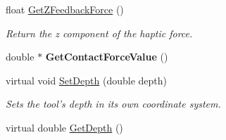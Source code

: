 \begin{DoxyCompactItemize}
float \hyperlink{classvtkToolLaparoscopy_a2743b59822a1b2b2d8c04f45dca44e32}{GetZFeedbackForce} ()
\begin{DoxyCompactList}\small\item\em Return the z component of the haptic force. \item\end{DoxyCompactList}\item 
\hypertarget{classvtkToolLaparoscopy_a18bfe188dcad7c3a92cfdcd8ae884793}{
double $\ast$ {\bfseries GetContactForceValue} ()}
\label{classvtkToolLaparoscopy_a18bfe188dcad7c3a92cfdcd8ae884793}

\item 
\hypertarget{classvtkToolLaparoscopy_aea85d0db2cb378945849caacee3bc9c3}{
virtual void \hyperlink{classvtkToolLaparoscopy_aea85d0db2cb378945849caacee3bc9c3}{SetDepth} (double depth)}
\label{classvtkToolLaparoscopy_aea85d0db2cb378945849caacee3bc9c3}

\begin{DoxyCompactList}\small\item\em Sets the tool's depth in its own coordinate system. \item\end{DoxyCompactList}\item 
\hypertarget{classvtkToolLaparoscopy_a2d28c6db45f08f54b1153e0f258502c0}{
virtual double \hyperlink{classvtkToolLaparoscopy_a2d28c6db45f08f54b1153e0f258502c0}{GetDepth} ()}
\label{classvtkToolLaparoscopy_a2d28c6db45f08f54b1153e0f258502c0}


\end{DoxyCompactItemize}
